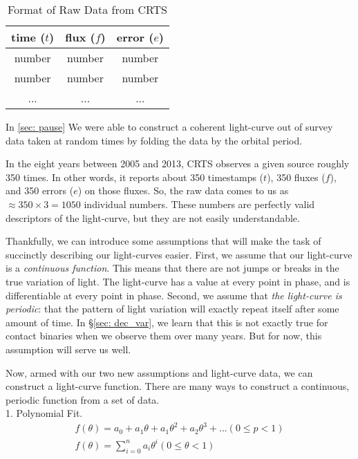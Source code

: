 \documentclass[12pt]{article} %
\numberwithin{equation}{section} %
\begin{document}
\begin{table}[htdp]
\caption{Format of Raw Data from CRTS}
\begin{center}
\begin{tabular}{|c|c|c|} \hline
\textbf{time} ($t$) & \textbf{flux} ($f$) & \textbf{error} ($e$) \\ \hline
number & number & number \\ \hline
number & number & number \\ \hline
... & ... & ... \\
\end{tabular}
\end{center}
\label{default}
\end{table}%

In \ref{sec: pause} We were able to construct a coherent light-curve out of survey data taken at random times by folding the data by the orbital period.

In the eight years between 2005 and 2013, CRTS observes a given source roughly 350 times. In other words, it reports about 350 timestamps ($t$), 350 fluxes ($f$), and 350 errors ($e$) on those fluxes. So, the raw data comes to us as $\approx 350 \times 3 = 1050$ individual numbers. These numbers are perfectly valid descriptors of the light-curve, but they are not easily understandable.  

Thankfully, we can introduce some assumptions that will make the task of succinctly describing our light-curves easier. First, we assume that our light-curve is a \emph{continuous function}. This means that there are not jumps or breaks in the true variation of light. The light-curve has a value at every point in phase, and is differentiable at every point in phase. Second, we assume that \emph{the light-curve is periodic}: that the pattern of light variation will exactly repeat itself after some amount of time. In \S\ref{sec: dec_var}, we learn that this is not exactly true for contact binaries when we observe them over many years. But for now, this assumption will serve us well.

Now, armed with our two new assumptions and light-curve data, we can construct a light-curve function. There are many ways to construct a continuous, periodic function from a set of data. \\

1. Polynomial Fit. \\

\begin{multline} \label{eqn: polynomial_fit}
f(\theta) = a_{0} + a_{1}\theta + a_{1}\theta^{2} + a_{2}\theta^{3} + ... (0 \leq p < 1) \\
f(\theta) = \sum_{i = 0}^{n} a_{i}\theta^{i}  (0 \leq \theta < 1)
\end{multline}
\end{document}
